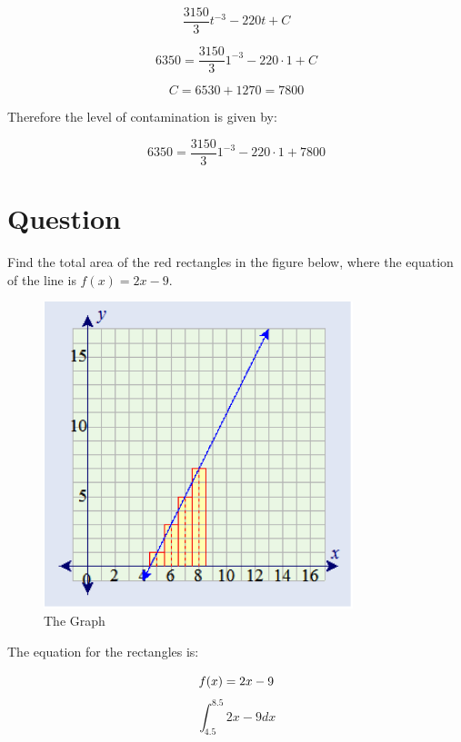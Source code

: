 \documentclass[12pt]{article}
\begin{document}
\begin{equation}
  \frac{3150}{3}t^{-3} - 220t +C
\end{equation}

\begin{equation}
  6350 =\frac{3150}{3}1^{-3} - 220 \cdot 1 + C
\end{equation}

\begin{equation}
  C = 6530 + 1270 = 7800
\end{equation}

Therefore the level of contamination is given by:

\begin{equation}
  6350 =\frac{3150}{3}1^{-3} - 220 \cdot 1 + 7800
\end{equation}

\section{Question}
\label{sec:q3}

Find the total area of the red rectangles in the figure below, where the
equation of the line is $f(x)=2x-9$.

\begin{figure}[ht!]
\centering
\includegraphics[width=90mm]{graph.png}
\caption{The Graph\label{overflow}}
\end{figure}

The equation for the rectangles is:

\begin{equation}
  \setcounter{equation}{0}
  f(x)=2x-9
\end{equation}
\begin{equation}
  \int_{4.5}^{8.5} 2x-9 dx
\end{equation}
\end{document}
